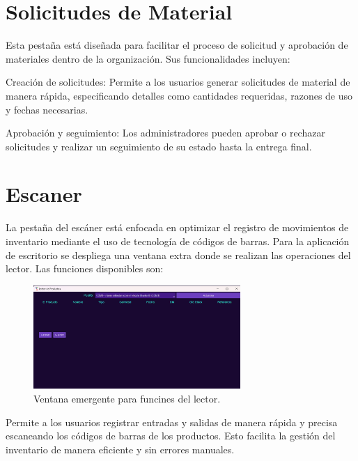 \section{Solicitudes de Material}

Esta pestaña está diseñada para facilitar el proceso de solicitud y aprobación de materiales dentro de la organización. Sus funcionalidades incluyen: 

Creación de solicitudes: Permite a los usuarios generar solicitudes de material de manera rápida, especificando detalles como cantidades requeridas, razones de uso y fechas necesarias. 

Aprobación y seguimiento: Los administradores pueden aprobar o rechazar solicitudes y realizar un seguimiento de su estado hasta la entrega final. 

\section{Escaner}

La pestaña del escáner está enfocada en optimizar el registro de movimientos de inventario mediante el uso de tecnología de códigos de barras. Para la aplicación de escritorio se despliega una ventana extra donde se realizan las operaciones del lector. Las funciones disponibles son: 

\begin{figure}[ht!]
\centering
\includegraphics[width=0.7\textwidth]{imgs/LectorApp.png}
\caption{Ventana emergente para funcines del lector.}
\label{fig:lecotr}
\end{figure}

Permite a los usuarios registrar entradas y salidas de manera rápida y precisa escaneando los códigos de barras de los productos. Esto facilita la gestión del inventario de manera eficiente y sin errores manuales.

